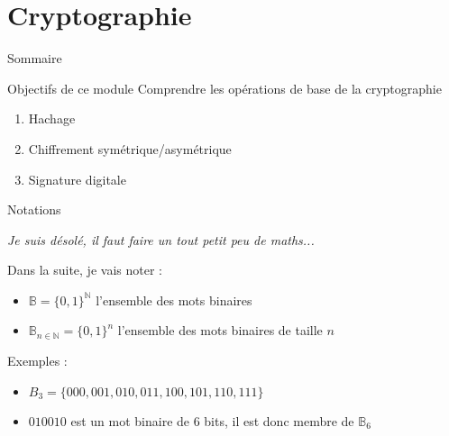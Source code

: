 \section{Cryptographie}

\begin{frame}{Sommaire}
  \setcounter{tocdepth}{2}
\end{frame}

\begin{frame}{Objectifs de ce module}
  Comprendre les opérations de base de la cryptographie
  \begin{enumerate}
    \item Hachage
    \item Chiffrement symétrique/asymétrique
    \item Signature digitale
  \end{enumerate}
\end{frame}

\begin{frame}{Notations}
  \begin{tiny}
    \textit{Je suis désolé, il faut faire un tout petit peu de maths...}
  \end{tiny}

  Dans la suite, je vais noter :

  \begin{itemize}
    \item $\mathbb{B} = \{0,1\}^\mathbb{N}$ l'ensemble des mots binaires
    \item $\mathbb{B}_{n \in \mathbb{N}} = \{0,1\}^n$ l'ensemble des mots binaires de taille $n$
  \end{itemize}

  Exemples :

  \begin{itemize}
    \item $B_3 = \{000, 001, 010, 011, 100, 101, 110, 111\}$
    \item $010010$ est un mot binaire de 6 bits, il est donc membre de $\mathbb{B}_6$
  \end{itemize}
\end{frame}

